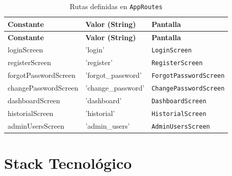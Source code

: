 \documentclass[12pt,a4paper]{article}
\begin{document}
\begin{longtable}{>{\ttfamily}p{4.5cm} >{\ttfamily}p{4.5cm} p{4.5cm}}
\caption{Rutas definidas en \texttt{AppRoutes}} \label{tab:rutas} \\
\toprule
\textbf{Constante} & \textbf{Valor (String)} & \textbf{Pantalla} \\
\midrule
\endfirsthead
\toprule
\textbf{Constante} & \textbf{Valor (String)} & \textbf{Pantalla} \\
\midrule
\endhead
\bottomrule
\endlastfoot
loginScreen          & 'login'           & \texttt{LoginScreen} \\
registerScreen       & 'register'        & \texttt{RegisterScreen} \\
forgotPasswordScreen & 'forgot\_password' & \texttt{ForgotPasswordScreen} \\
changePasswordScreen & 'change\_password' & \texttt{ChangePasswordScreen} \\
dashboardScreen      & 'dashboard'       & \texttt{DashboardScreen} \\
historialScreen      & 'historial'       & \texttt{HistorialScreen} \\
adminUsersScreen     & 'admin\_users'     & \texttt{AdminUsersScreen} \\
\end{longtable}

\section{Stack Tecnológico}
\end{document}
